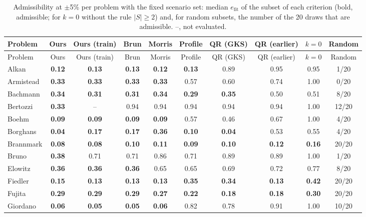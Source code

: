 \begingroup\scriptsize\setlength{\tabcolsep}{2.5pt}
\begin{longtable}{@{}lccccccccc@{}}
\caption{Admissibility at $\pm$5\% per problem with the fixed scenario set: median $e_{\mathrm{fit}}$ of the subset of each criterion (bold, admissible; for $k=0$ without the rule $|S|\ge2$) and, for random subsets, the number of the 20 draws that are admissible. --, not evaluated.}\label{tab:admisaudit2}\\
\toprule
Problem & Ours & Ours (train) & Brun & Morris & Profile & QR (GKS) & QR (earlier) & $k=0$ & Random \\
\midrule
\endfirsthead
\toprule
Problem & Ours & Ours (train) & Brun & Morris & Profile & QR (GKS) & QR (earlier) & $k=0$ & Random \\
\midrule
\endhead
Alkan & \textbf{0.12} & \textbf{0.13} & \textbf{0.13} & \textbf{0.12} & \textbf{0.13} & 0.89 & 0.95 & 0.95 & 1/20 \\
Armistead & \textbf{0.33} & \textbf{0.33} & \textbf{0.33} & \textbf{0.33} & 0.57 & 0.60 & 0.74 & 1.00 & 0/20 \\
Bachmann & \textbf{0.34} & \textbf{0.31} & \textbf{0.31} & \textbf{0.34} & \textbf{0.29} & \textbf{0.35} & 0.50 & 0.51 & 8/20 \\
Bertozzi & \textbf{0.33} & -- & 0.94 & 0.94 & 0.94 & 0.94 & 0.94 & 1.00 & 12/20 \\
Boehm & \textbf{0.09} & \textbf{0.09} & \textbf{0.09} & \textbf{0.09} & 0.57 & 0.46 & 0.67 & 1.00 & 4/20 \\
Borghans & \textbf{0.04} & \textbf{0.17} & \textbf{0.17} & \textbf{0.36} & \textbf{0.10} & \textbf{0.04} & 0.53 & 0.55 & 4/20 \\
Brannmark & \textbf{0.08} & \textbf{0.08} & \textbf{0.10} & \textbf{0.11} & \textbf{0.09} & \textbf{0.10} & \textbf{0.12} & \textbf{0.16} & 20/20 \\
Bruno & \textbf{0.38} & 0.71 & 0.71 & 0.86 & 0.71 & 0.89 & 0.89 & 1.00 & 1/20 \\
Elowitz & \textbf{0.36} & \textbf{0.36} & \textbf{0.36} & 0.65 & 0.65 & 0.69 & 0.72 & 0.77 & 8/20 \\
Fiedler & \textbf{0.15} & \textbf{0.13} & \textbf{0.13} & \textbf{0.13} & \textbf{0.35} & \textbf{0.34} & \textbf{0.13} & \textbf{0.42} & 20/20 \\
Fujita & \textbf{0.29} & \textbf{0.29} & \textbf{0.29} & \textbf{0.27} & \textbf{0.22} & \textbf{0.18} & \textbf{0.18} & \textbf{0.30} & 20/20 \\
Giordano & \textbf{0.06} & \textbf{0.05} & \textbf{0.05} & \textbf{0.06} & 0.82 & 0.78 & 0.91 & 1.00 & 10/20 \\

\end{longtable}
